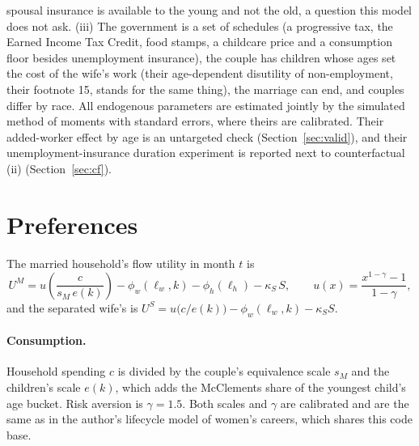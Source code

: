 \documentclass[11pt]{article}
\newcommand{\1}{\mathbf{1}}
\begin{document}
spousal insurance is available to the young and not the old, a question this model does not ask. (iii) The government
is a set of schedules (a progressive tax, the Earned Income Tax Credit, food stamps, a childcare price and a consumption
floor besides unemployment insurance), the couple has children whose ages set the cost of the wife's work (their
age-dependent disutility of non-employment, their footnote 15, stands for the same thing), the marriage can end, and
couples differ by race. All endogenous parameters are estimated jointly by the simulated method of moments with
standard errors, where theirs are calibrated. Their added-worker effect by age is an untargeted check
(Section~\ref{sec:valid}), and their unemployment-insurance duration experiment is reported next to counterfactual
(ii) (Section~\ref{sec:cf}).

\section{Preferences}\label{sec:prefs}

The married household's flow utility in month $t$ is
\begin{equation}\label{eq:uM}
  U^M = u\!\left(\frac{c}{s_M\, e(k)}\right) - \phi_w(\ell_w, k) - \phi_h(\ell_h) - \kappa_S\, S,
  \qquad u(x) = \frac{x^{1-\gamma} - 1}{1-\gamma},
\end{equation}
and the separated wife's is $U^S = u\big(c / e(k)\big) - \phi_w(\ell_w, k) - \kappa_S S$.

\paragraph{Consumption.} Household spending $c$ is divided by the couple's equivalence scale $s_M$ and the children's
scale $e(k)$, which adds the McClements share of the youngest child's age bucket. Risk aversion is $\gamma = 1.5$. Both
scales and $\gamma$ are calibrated and are the same as in the author's lifecycle model of women's careers, which shares
this code base.
\end{document}
